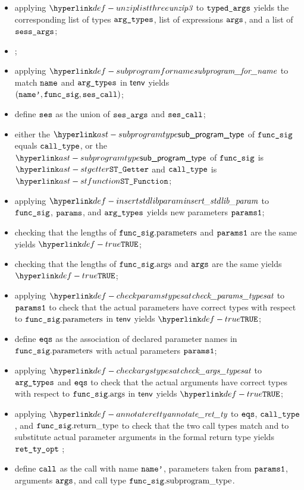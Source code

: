 \ProseParagraph
\AllApply
\begin{itemize}
  \item applying $\unziplistthree$ to $\texttt{typed\_args}$ yields the corresponding list of types $\texttt{arg\_types}$,
        list of expressions $\texttt{args}$, and a list of \sideeffectdescriptorsetsterm\ $\vsessargs$;
  \item \Prosenonconflictingunion{$\vsessargs$}{$\vsesargs$};
  \item applying $\subprogramforname$ to match $\texttt{name}$ and $\texttt{arg\_types}$ in $\textsf{tenv}$
        yields \\ $(\texttt{name'}, \texttt{func\_sig}, \texttt{ses\_call})$\ProseOrTypeError;
  \item define $\texttt{ses}$ as the union of $\vsesargs$ and $\texttt{ses\_call}$;
  \item either the $\subprogramtype$ of $\texttt{func\_sig}$ equals $\texttt{call\_type}$,
        or the $\subprogramtype$ of $\texttt{func\_sig}$ is $\STGetter$ and $\texttt{call\_type}$ is $\STFunction$\ProseTerminateAs{\BadCall};
  \item applying $\insertstdlibparam$ to $\texttt{func\_sig}$, $\texttt{params}$, and $\texttt{arg\_types}$ yields new parameters $\texttt{params1}$;
  \item checking that the lengths of $\texttt{func\_sig}.\text{parameters}$ and $\texttt{params1}$ are the same yields $\True$\ProseTerminateAs{\BadCall};
  \item checking that the lengths of $\texttt{func\_sig}.\text{args}$ and $\texttt{args}$ are the same yields $\True$\ProseTerminateAs{\BadCall};
  \item applying $\checkparamstypesat$ to $\texttt{params1}$
        to check that the actual parameters have correct types with respect to $\texttt{func\_sig}.\text{parameters}$
        in $\textsf{tenv}$ yields $\True$\ProseOrTypeError;
  \item define $\texttt{eqs}$ as the association of declared parameter names in $\texttt{func\_sig}.\text{parameters}$ with actual parameters $\texttt{params1}$;
  \item applying $\checkargstypesat$ to $\texttt{arg\_types}$ and $\texttt{eqs}$
        to check that the actual arguments have correct types with respect to $\texttt{func\_sig}.\text{args}$
        in $\textsf{tenv}$ yields $\True$\ProseOrTypeError;
  \item applying $\annotateretty$ to $\texttt{eqs}$, $\texttt{call\_type}$, and $\texttt{func\_sig}.\text{return\_type}$
        to check that the two call types match and to substitute actual parameter arguments in the formal return type
        yields $\texttt{ret\_ty\_opt}$ \ProseOrTypeError;
  \item define $\texttt{call}$ as the call with name $\texttt{name'}$, parameters taken from $\texttt{params1}$, arguments $\texttt{args}$,
        and call type $\texttt{func\_sig}.\text{subprogram\_type}$.
\end{itemize}
